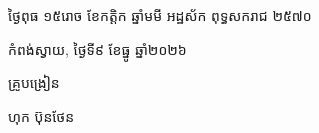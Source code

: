 \documentclass[a4paper,10pt]{article}
\begin{document}
\vspace{6pt}
{\centering
\hspace*{5.2cm}\begin{minipage}{11.5cm}
  \centering
  ថ្ងៃពុធ ១៥រោច ខែកត្តិក ឆ្នាំមមី អដ្ឋស័ក ពុទ្ធសករាជ ២៥៧០\par
  កំពង់ស្វាយ, ថ្ងៃទី៩ ខែធ្នូ ឆ្នាំ២០២៦\par
  \vspace{2pt}
  {\muol គ្រូបង្រៀន\par}
  \vspace{32pt}
  \hfill{\muol ហុក ប៊ុនថែន}\hspace*{1.4cm}
\end{minipage}\par}
\end{document}
